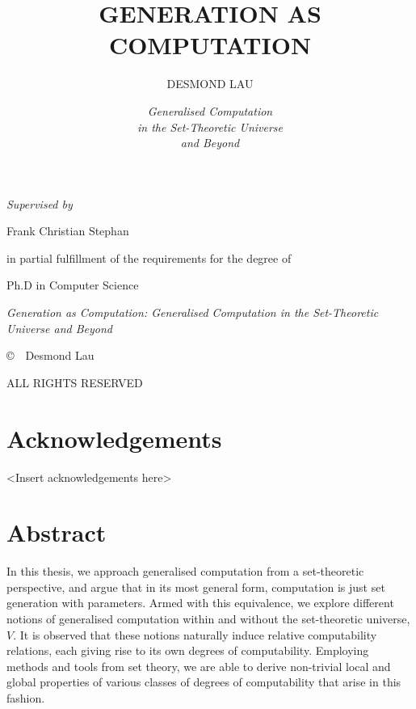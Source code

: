 \documentclass[12pt, twoside]{memoir}
\author{DESMOND LAU}
\title{GENERATION AS COMPUTATION}
\date{\textit{Generalised Computation \\ in the Set-Theoretic Universe \\ and Beyond}}
\makeatletter
\numberwithin{equation}{section}
\def\maketitle{%
  \null
  \thispagestyle{empty}%
  \vfill
  \begin{center}\leavevmode
    \normalfont
    {\LARGE \bfseries \raggedleft \@author\par}%
    \hrulefill\par
    {\huge  \raggedright 
    	\begin{changemargin}{0cm}{5cm} \@title
		\end{changemargin}}%
    {\LARGE  \raggedright 
    	\begin{changemargin}{0cm}{5cm} \@date
		\end{changemargin} \par}%
  \end{center}%
  \vfill
  \null
  \cleardoublepage
  }
\theoremstyle{definition}
\theoremstyle{remark}
\theoremstyle{definition}
\theoremstyle{definition}
\theoremstyle{definition}
\theoremstyle{remark}
\newcommand{\blankpage}{
\newpage
\thispagestyle{empty}
\mbox{}
\newpage
}
\makeatother
\begin{document}
\let\cleardoublepage\clearpage


\maketitle


\blankpage

\frontmatter

\clearpage
\thispagestyle{empty}

\null\vfill

\begin{center}
\Large \textit{Supervised by}
\end{center}

\begin{center}
\Large Frank Christian Stephan
\end{center}
\vfill\null

\null\vfill
\begin{center}
\large in partial fulfillment of the requirements for the degree of
\end{center}
\begin{center}
\large Ph.D in Computer Science
\end{center}

\vfill\null

\clearpage

\null\vfill

\begin{flushleft}
\textit{Generation as Computation: Generalised Computation in the Set-Theoretic Universe and Beyond} 

\medskip

\copyright \ \the\year \ Desmond Lau

\bigskip





ALL RIGHTS RESERVED

\end{flushleft}

\chapter{Acknowledgements}
\thispagestyle{simple}
<Insert acknowledgements here>

\blankpage

\chapter{Abstract}
\thispagestyle{simple}
In this thesis, we approach generalised computation from a set-theoretic perspective, and argue that in its most general form, computation is just set generation with parameters. Armed with this equivalence, we explore different notions of generalised computation within and without the set-theoretic universe, $V$. It is observed that these notions naturally induce relative computability relations, each giving rise to its own degrees of computability. Employing methods and tools from set theory, we are able to derive non-trivial local and global properties of various classes of degrees of computability that arise in this fashion.
\end{document}
